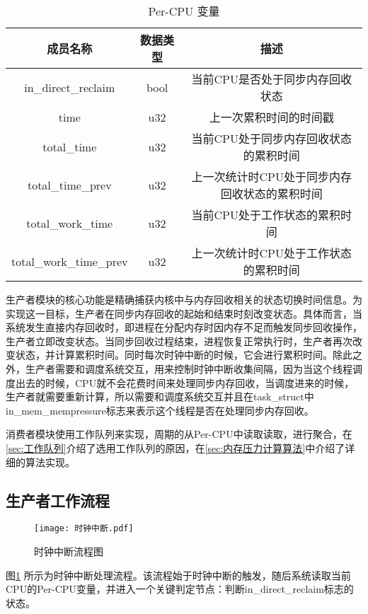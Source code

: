 \begin{table}[htbp]
    \centering
    \caption{Per-CPU 变量}
    \label{tab:sensor_data}
    \begin{tabular}{ccc}
        \toprule
        成员名称& 数据类型     & 描述                                        \\ \midrule
        in\_direct\_reclaim & bool & 当前CPU是否处于同步内存回收状态\\
        \midrule
        time & u32 & 上一次累积时间的时间戳\\
        \midrule
        total\_time &u32&当前CPU处于同步内存回收状态的累积时间\\
        \midrule
        total\_time\_prev&u32&上一次统计时CPU处于同步内存回收状态的累积时间\\
        \midrule
        total\_work\_time&u32&当前CPU处于工作状态的累积时间\\
        \midrule
        total\_work\_time\_prev&u32&上一次统计时CPU处于工作状态的累积时间\\
        \bottomrule
    \end{tabular}
  \end{table}

生产者模块的核心功能是精确捕获内核中与内存回收相关的状态切换时间信息。为实现这一目标，生产者在同步内存回收的起始和结束时刻改变状态。具体而言，当系统发生直接内存回收时，即进程在分配内存时因内存不足而触发同步回收操作，生产者立即改变状态。当同步回收过程结束，进程恢复正常执行时，生产者再次改变状态，并计算累积时间。同时每次时钟中断的时候，它会进行累积时间。除此之外，生产者需要和调度系统交互，用来控制时钟中断收集间隔，因为当这个线程调度出去的时候，CPU就不会花费时间来处理同步内存回收，当调度进来的时候，生产者就需要重新计算，所以需要和调度系统交互并且在task\_struct中in\_mem\_mempressure标志来表示这个线程是否在处理同步内存回收。

消费者模块使用工作队列来实现，周期的从Per-CPU中读取读取，进行聚合，在\ref{sec:工作队列}介绍了选用工作队列的原因，在\ref{sec:内存压力计算算法}中介绍了详细的算法实现。


\subsection{生产者工作流程}

\begin{figure}[htbp]
    \centering
    \texttt{[image: 时钟中断.pdf]}
    \caption{时钟中断流程图}
    \label{fig:time-ticker}
\end{figure}
图\ref{fig:time-ticker} 所示为时钟中断处理流程。该流程始于时钟中断的触发，随后系统读取当前CPU的Per-CPU变量，并进入一个关键判定节点：判断in\_direct\_reclaim标志的状态。

